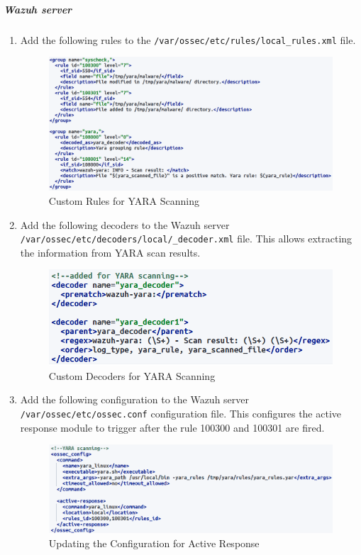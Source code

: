\subparagraph{Wazuh server}
\begin{enumerate}
    \item Add the following rules to the \texttt{/var/ossec/etc/rules/local\_rules.xml} file.
    \begin{figure}[H]
        \centering
        \includegraphics[width=\textwidth]{images/malware-detection/yara/2.png}
        \caption{Custom Rules for YARA Scanning}
        \label{fig:yara-rules}
    \end{figure}

    \item Add the following decoders to the Wazuh server \texttt{/var/ossec/etc/decoders/local/\_decoder.xml} file. This allows extracting the information from YARA scan results.
    \begin{figure}[H]
        \centering
        \includegraphics[width=\textwidth]{images/malware-detection/yara/3.png}
        \caption{Custom Decoders for YARA Scanning}
        \label{fig:yara-decoders}
    \end{figure}

    \item Add the following configuration to the Wazuh server \texttt{/var/ossec/etc/ossec.conf} configuration file. This configures the active response module to trigger after the rule 100300 and 100301 are fired.
    \begin{figure}[H]
        \centering
        \includegraphics[width=\textwidth]{images/malware-detection/yara/4.png}
        \caption{Updating the Configuration for Active Response}
        \label{fig:yara-config}
    \end{figure}
\end{enumerate}

